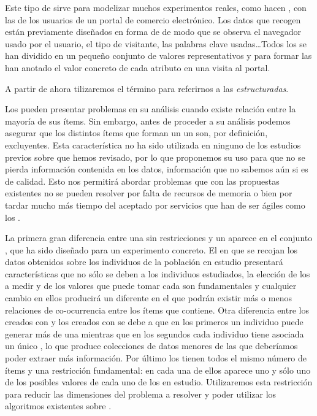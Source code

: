 Este tipo de \transacciones sirve para modelizar muchos experimentos reales, como hacen \cite{CarmonaRGallegoTorresBernalDelJesusGarcia-WUMtoImprovePortalDesign-2012}, con las \sns de los usuarios de un portal de comercio electrónico. Los datos que recogen están previamente diseñados en forma de \atributos de modo que se observa el navegador usado por el usuario, el tipo de visitante, las palabras clave usadas\ldots Todos los \atributos se han dividido en un pequeño conjunto de valores representativos y para formar las \transacciones han anotado el valor concreto de cada atributo en una visita al portal.

A partir de ahora tilizaremos el término \registro para referirnos a las \transacciones \emph{estructuradas}.

Los \registros pueden presentar problemas en su análisis cuando existe relación entre la mayoría de sus ítems. Sin embargo, antes de proceder a su análisis podemos asegurar que los distintos ítems que forman un un \atributo son, por definición, excluyentes. Esta característica no ha sido utilizada en ninguno de los estudios previos sobre \ARM que hemos revisado, por lo que proponemos su uso para que no se pierda información contenida en los datos, información que no sabemos aún si es de calidad. Esto nos permitirá abordar problemas que con las propuestas existentes no se pueden resolver por falta de recursos de memoria o bien por tardar mucho más tiempo del aceptado por servicios que han de ser ágiles como los \srs.

La primera gran diferencia entre una \transaccion sin restricciones y un \registro aparece en el conjunto \I, que ha sido diseñado para un experimento concreto. El \dataset en que se recojan los datos obtenidos sobre los individuos de la población en estudio presentará características que no sólo se deben a los individuos estudiados, la elección de los \atributos a medir y de los valores que puede tomar cada \atributo son fundamentales y cualquier cambio en ellos producirá un \dataset diferente en el que podrán existir más o menos relaciones de co-ocurrencia entre los ítems que contiene. Otra diferencia entre los \datasets creados con \transacciones y los creados con \registros se debe a que en los primeros un individuo puede generar más de una \transaccion mientras que en los segundos cada individuo tiene asociada un único \registro, lo que produce colecciones de datos menores de las que deberíamos poder extraer más información. Por último los \registros tienen todos el mismo número de ítems y una restricción fundamental: en cada una de ellos aparece uno y sólo uno de los posibles valores de cada uno de los \atributos en estudio. Utilizaremos esta restricción para reducir las dimensiones del problema a resolver y poder utilizar los algoritmos existentes sobre \ARM.

